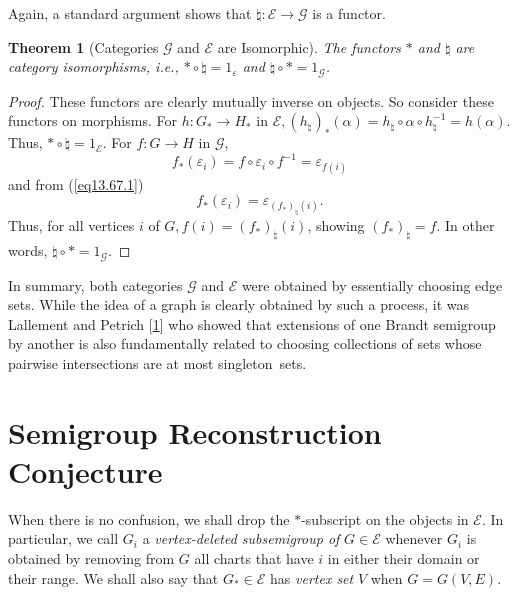 \documentclass{surv-l}
\numberwithin{equation}{section}
\numberwithin{table}{section}
\numberwithin{figure}{section}
\newtheorem{theorem}[equation]{Theorem}
\theoremstyle{definition}
\begin{document}
Again, a standard argument shows that $\natural :
\mathcal{E}\rightarrow \mathcal{G}$ is a functor.

\begin{theorem}[Categories $\mathcal{G}$ and $\mathcal{E}$ are
Isomorphic]\label{thm13.67.4} The functors
$*$ and $\natural$ are category isomorphisms, i.e.,
$*\circ \natural=1_{\varepsilon}$ and
$\natural\circ*=1_{\mathcal{G}}$.
\end{theorem}

\begin{proof}These functors are clearly mutually inverse on
objects. So consider these functors on morphisms. For $h :
G_{\ast}\rightarrow H_{\ast}$ in $\mathcal{E},
(h_{\natural})_{\ast}(\alpha)=h_{\natural}\circ \alpha
\circ h_{\natural}^{-1}= h(\alpha)$. Thus, $*\circ
\natural =1_{\mathcal{E}}$. For $f:G\rightarrow H$
in $\mathcal{G}$,
\[
f_{\ast}(\varepsilon_{i})=f\circ\varepsilon_{i}\circ f^{-1}=\varepsilon_{f(i)}
\]
and from (\ref{eq13.67.1})
\[
f_{\ast}(\varepsilon_{i})=\varepsilon_{(f_{\ast})_{\natural}(i)}.
\]
Thus, for all vertices $i$ of $G,
f(i)=(f_{\ast})_{\natural}(i)$, showing
$(f_{\ast})_{\natural}=f$. In other words, $\natural
\circ *=1_{\mathcal{G}}.$
\end{proof}

In summary, both categories $\mathcal{G}$ and $\mathcal{E}$ were
obtained by essentially choosing edge sets. While the idea of a
graph is clearly obtained by such a process, it was
Lallement and Petrich
[\hyperlink{bib39}{1}] who showed that extensions of one
Brandt semigroup by another is also fundamentally related to
choosing collections of sets whose pairwise intersections are at
most singleton~sets.

\section{Semigroup Reconstruction Conjecture}\label{sec13.68}

When there is no confusion, we shall drop the $*$-subscript on the
objects in $\mathcal{E}$. In particular, we call $G_{i}$ a
\emph{vertex-deleted subsemigroup of} $G\in \mathcal{E}$ whenever $G_{i}$ is obtained
by removing from $G$ all charts that have $i$ in either their
domain or their range. We shall also say that $G_{\ast}\in
\mathcal{E}$ has \emph{vertex set} $V$
when $G=G(V, E)$.\\
\end{document}
